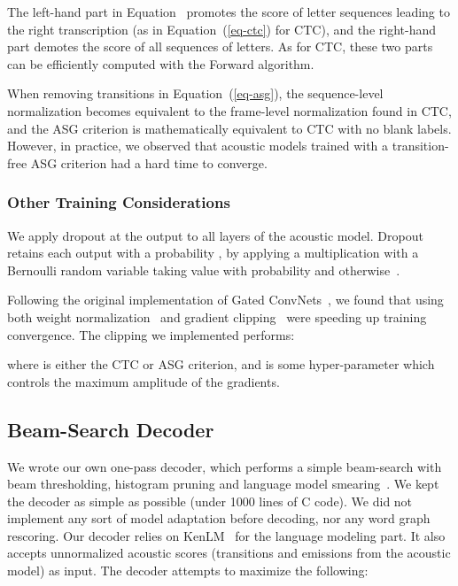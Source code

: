 \documentclass{article}
\begin{document}
The left-hand part in Equation~ promotes the score of
letter sequences leading to the right transcription (as in
Equation~(\ref{eq-ctc}) for CTC), and the right-hand part demotes the score
of all sequences of letters.
As for CTC, these two parts can be efficiently computed with the Forward
algorithm.

When removing transitions in Equation~(\ref{eq-asg}), the sequence-level
normalization becomes equivalent to the frame-level normalization found in
CTC, and the ASG criterion is mathematically equivalent to CTC with no
blank labels. However, in practice, we observed that acoustic models
trained with a transition-free ASG criterion had a hard time to converge.





\subsubsection{Other Training Considerations}
\label{sec-dropout}

We apply dropout at the output to all layers of the acoustic model. Dropout
retains each output with a probability , by applying a multiplication
with a Bernoulli random variable taking value  with probability 
and  otherwise~\citep{srivastava2014dropout}.

Following the original implementation of Gated
ConvNets~\citep{dauphin2017lm}, we found that using both weight
normalization~\citep{salimans2016wn} and gradient
clipping~\citep{pascanu2013rnn} were speeding up training convergence. The clipping
we implemented performs:

where  is either the CTC or ASG criterion, and  is some
hyper-parameter which controls the maximum amplitude of the gradients.

\subsection{Beam-Search Decoder}
\label{sec-decoder}
We wrote our own one-pass decoder, which performs a simple beam-search with
beam thresholding, histogram pruning and language model
smearing~\citep{steinbiss1994improvements}. We kept the decoder as simple as
possible (under 1000 lines of C code). We did not implement any sort of
model adaptation before decoding, nor any word graph rescoring. Our decoder
relies on KenLM~\citep{heafield2013scalable} for the language modeling
part. It also accepts unnormalized acoustic scores (transitions and
emissions from the acoustic model) as input. The decoder attempts to maximize
the following:
\end{document}
